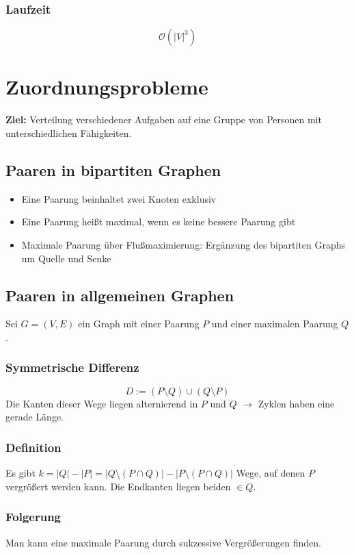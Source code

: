 \subsubsection{Laufzeit}
\[\mathcal{O}(|V|^3)\]



\section{Zuordnungsprobleme}
\textbf{Ziel:} Verteilung verschiedener Aufgaben auf eine Gruppe von Personen mit unterschiedlichen Fähigkeiten.

\subsection{Paaren in bipartiten Graphen}
\begin{itemize}
	\item Eine Paarung beinhaltet zwei Knoten exklusiv
	\item Eine Paarung heißt maximal, wenn es keine bessere Paarung gibt
	\item Maximale Paarung über Flußmaximierung: Ergänzung des bipartiten Graphs um Quelle und Senke
\end{itemize}


\subsection{Paaren in allgemeinen Graphen}
Sei \(G=(V,E)\) ein Graph mit einer Paarung \(P\) und einer maximalen Paarung \(Q\).

\subsubsection{Symmetrische Differenz}
\[D:=(P\setminus Q) \cup (Q \setminus P)\]
Die Kanten dieser Wege liegen alternierend in \(P\) und \(Q\) \(\rightarrow\) Zyklen haben eine gerade Länge.

\subsubsection{Definition}
Es gibt \(k= |Q|-|P|=|Q\setminus (P \cap Q)| - |P\setminus (P \cap Q)|\) Wege, auf denen \(P\) vergrößert werden kann. Die Endkanten liegen beiden \(\in Q\).

\subsubsection{Folgerung}
Man kann eine maximale Paarung durch sukzessive Vergrößerungen finden.

